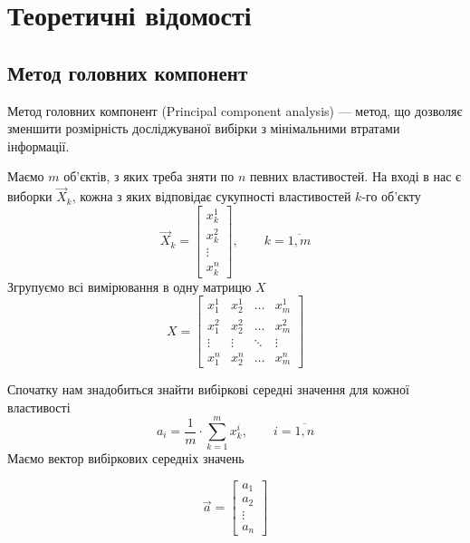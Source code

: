 \section{Теоретичні відомості}
\subsection{Метод головних компонент}
Метод головних компонент (Principal component analysis) --- метод, що дозволяє
зменшити розмірність досліджуваної вибірки з мінімальними втратами інформації.

Маємо $m$ об’єктів, з яких треба зняти по $n$ певних властивостей.
На вході в нас є виборки $\vec{X}_k$, кожна з яких відповідає сукупності
властивостей $k$-го об’єкту
\begin{equation*}
  \vec{X}_k = \begin{bmatrix}
    x_k^1  \\
    x_k^2  \\
    \vdots \\
    x_k^n
  \end{bmatrix},
  \qquad k = \overline{1,m}
\end{equation*}
Згрупуємо всі вимірювання в одну матрицю $X$
\begin{equation*}
  X = \begin{bmatrix}
    x_1^1  & x_2^1  & \dots  & x_m^1  \\
    x_1^2  & x_2^2  & \dots  & x_m^2  \\
    \vdots & \vdots & \ddots & \vdots \\
    x_1^n  & x_2^n  & \dots  & x_m^n
  \end{bmatrix}
\end{equation*}

Спочатку нам знадобиться знайти вибіркові середні значення для кожної
властивості
\begin{equation*}
  a_i = \frac{1}{m} \cdot \sum_{k=1}^{m} x_k^i, \qquad i = \overline{1,n}
\end{equation*}
Маємо вектор вибіркових середніх значень
\begin{comment}
\begin{equation*}
  \vec{a} = \begin{bmatrix}
    \frac{1}{m} \sum_{k=1}^{m} x_k^1 \\
    \frac{1}{m} \sum_{k=1}^{m} x_k^2 \\
    \vdots                           \\
    \frac{1}{m} \sum_{k=1}^{m} x_k^n \\
  \end{bmatrix}
\end{equation*}
\end{comment}
\begin{equation*}
  \vec{a} = \begin{bmatrix}
    a_1    \\
    a_2    \\
    \vdots \\
    a_n
  \end{bmatrix}
\end{equation*}

